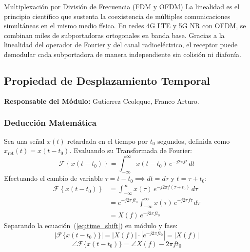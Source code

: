 \documentclass[11pt,a4paper]{article}
\begin{document}
\begin{telecomAppBox}{Multiplexaci\'on por Divisi\'on de Frecuencia (FDM y OFDM)}
La linealidad es el principio cient\'ifico que sustenta la coexistencia de m\'ultiples comunicaciones simult\'aneas en el mismo medio f\'isico. En redes 4G LTE y 5G NR con OFDM, se combinan miles de subportadoras ortogonales en banda base. Gracias a la linealidad del operador de Fourier y del canal radioel\'ectrico, el receptor puede demodular cada subportadora de manera independiente sin colisi\'on ni diafon\'ia.
\end{telecomAppBox}

\subsection{Propiedad de Desplazamiento Temporal}
\textbf{Responsable del M\'odulo:} Gutierrez Ccolqque, Franco Arturo.

\subsubsection{Deducci\'on Matem\'atica}
Sea una se\~nal $x(t)$ retardada en el tiempo por $t_0$ segundos, definida como $x_{\text{ret}}(t) = x(t - t_0)$. Evaluando su Transformada de Fourier:
\begin{equation}
  \mathcal{F}\left\{ x(t - t_0) \right\} = \int_{-\infty}^{\infty} x(t - t_0) \, e^{-j 2\pi f t} \, dt
\end{equation}
Efectuando el cambio de variable $\tau = t - t_0 \implies dt = d\tau$ y $t = \tau + t_0$:
\begin{align}
  \mathcal{F}\left\{ x(t - t_0) \right\} &= \int_{-\infty}^{\infty} x(\tau) \, e^{-j 2\pi f (\tau + t_0)} \, d\tau \nonumber \\
  &= e^{-j 2\pi f t_0} \int_{-\infty}^{\infty} x(\tau) \, e^{-j 2\pi f \tau} \, d\tau \nonumber \\
  &= X(f) \, e^{-j 2\pi f t_0}
  \label{eq:time_shift}
\end{align}
Separando la ecuaci\'on~(\ref{eq:time_shift}) en m\'odulo y fase:
\begin{equation}
  |\mathcal{F}\{ x(t - t_0) \}| = |X(f)| \cdot |e^{-j 2\pi f t_0}| = |X(f)|
\end{equation}
\begin{equation}
  \angle \mathcal{F}\{ x(t - t_0) \} = \angle X(f) - 2\pi f t_0
\end{equation}
\end{document}

